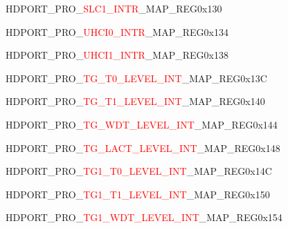 \vspace{-3em}
\begin{register}{H}{DPORT\_PRO\_\textcolor{red}{SLC1\_INTR}\_MAP\_REG}{0x130}\label{regdesc:PROSLC1INTRMAPREG}
\end{register}
\vspace{-3em}
\begin{register}{H}{DPORT\_PRO\_\textcolor{red}{UHCI0\_INTR}\_MAP\_REG}{0x134}\label{regdesc:PROUHCI0INTRMAPREG}
\end{register}
\vspace{-3em}
\begin{register}{H}{DPORT\_PRO\_\textcolor{red}{UHCI1\_INTR}\_MAP\_REG}{0x138}\label{regdesc:PROUHCI1INTRMAPREG}
\end{register}
\vspace{-3em}
\begin{register}{H}{DPORT\_PRO\_\textcolor{red}{TG\_T0\_LEVEL\_INT}\_MAP\_REG}{0x13C}\label{regdesc:PROTGT0LEVELINTMAPREG}
\end{register}
\vspace{-3em}
\begin{register}{H}{DPORT\_PRO\_\textcolor{red}{TG\_T1\_LEVEL\_INT}\_MAP\_REG}{0x140}\label{regdesc:PROTGT1LEVELINTMAPREG}
\end{register}
\vspace{-3em}
\begin{register}{H}{DPORT\_PRO\_\textcolor{red}{TG\_WDT\_LEVEL\_INT}\_MAP\_REG}{0x144}\label{regdesc:PROTGWDTLEVELINTMAPREG}
\end{register}
\vspace{-3em}
\begin{register}{H}{DPORT\_PRO\_\textcolor{red}{TG\_LACT\_LEVEL\_INT}\_MAP\_REG}{0x148}\label{regdesc:PROTGLACTLEVELINTMAPREG}
\end{register}
\vspace{-3em}
\begin{register}{H}{DPORT\_PRO\_\textcolor{red}{TG1\_T0\_LEVEL\_INT}\_MAP\_REG}{0x14C}\label{regdesc:PROTG1T0LEVELINTMAPREG}
\end{register}
\vspace{-3em}
\begin{register}{H}{DPORT\_PRO\_\textcolor{red}{TG1\_T1\_LEVEL\_INT}\_MAP\_REG}{0x150}\label{regdesc:PROTG1T1LEVELINTMAPREG}
\end{register}
\vspace{-3em}
\begin{register}{H}{DPORT\_PRO\_\textcolor{red}{TG1\_WDT\_LEVEL\_INT}\_MAP\_REG}{0x154}\label{regdesc:PROTG1WDTLEVELINTMAPREG}
\end{register}
